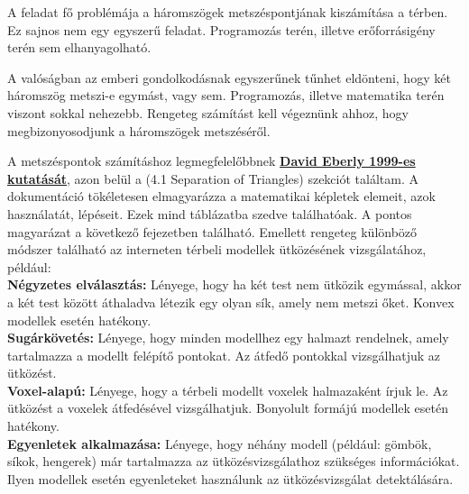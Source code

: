 
A feladat fő problémája a háromszögek metszéspontjának kiszámítása a térben. Ez sajnos nem egy egyszerű feladat. Programozás terén, illetve erőforrásigény terén sem elhanyagolható.

A valóságban az emberi gondolkodásnak egyszerűnek tűnhet eldönteni, hogy két háromszög metszi-e egymást, vagy sem. Programozás, illetve matematika terén viszont sokkal nehezebb. Rengeteg számítást kell végeznünk ahhoz, hogy megbizonyosodjunk a háromszögek metszéséről.

A metszéspontok számításhoz legmegfelelőbbnek \textbf{\href{https://www.geometrictools.com/Documentation/DynamicCollisionDetection.pdf}{David Eberly 1999-es kutatását}}, azon belül a \cite{triangles}(4.1 Separation of Triangles) szekciót találtam. A dokumentáció tökéletesen elmagyarázza a matematikai képletek elemeit, azok használatát, lépéseit. Ezek mind táblázatba szedve találhatóak. A pontos magyarázat a következő fejezetben található. Emellett rengeteg különböző módszer található az interneten térbeli modellek ütközésének vizsgálatához, például:\\

\textbullet\textbf{Négyzetes elválasztás:} Lényege, hogy ha két test nem ütközik egymással, akkor a két test között áthaladva létezik egy olyan sík, amely nem metszi őket. Konvex modellek esetén hatékony. \\

\textbullet\textbf{Sugárkövetés:} Lényege, hogy minden modellhez egy halmazt rendelnek, amely tartalmazza a modellt felépítő pontokat. Az átfedő pontokkal vizsgálhatjuk az ütközést. \\

\textbullet\textbf{Voxel-alapú:} Lényege, hogy a térbeli modellt voxelek halmazaként írjuk le. Az ütközést a voxelek átfedésével vizsgálhatjuk. Bonyolult formájú modellek esetén hatékony. \\

\textbullet\textbf{Egyenletek alkalmazása:} Lényege, hogy néhány modell (például: gömbök, síkok, hengerek) már tartalmazza az ütközésvizsgálathoz szükséges információkat. Ilyen modellek esetén egyenleteket használunk az ütközésvizsgálat detektálására. \\